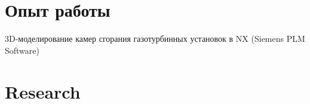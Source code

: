 \documentclass[a4paper]{resume}
\begin{document}
\begin{minipage}[t]{0.66\textwidth} %


\section{Опыт работы}


\vspace{\topsep} %
\begin{tightitemize}
\item 3D-моделирование камер сгорания газотурбинных установок в NX (Siemens PLM Software)
\end{tightitemize}

\sectionspace %


\begin{tightitemize}
\item 
\item 
\item 
\end{tightitemize}

\sectionspace %


\begin{tightitemize}
\item 
\item 
\item 
\end{tightitemize}

\sectionspace %


\section{Research}


\end{minipage}
\end{document}
